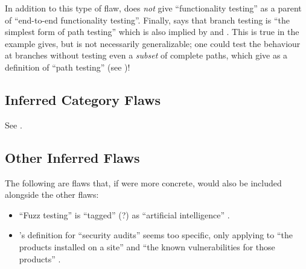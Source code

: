 

In addition to this type of flaw, \citep[Tab.~2]{Gerrard2000a} does
\emph{not} give ``functionality testing'' as a parent of ``end-to-end
functionality testing''. Finally, \citet[p.~119]{Patton2006} says that
branch testing is ``the simplest form of path testing'' which is also
implied by \citet[Fig.~F.1]{IEEE2021c} and
\citet[p.~433]{vanVliet2000}. This is true in the example
\citeauthor{Patton2006} gives, but is not necessarily generalizable; one
could test the behaviour at branches without testing even a \emph{subset}
of complete paths, which \citet[p.~316]{IEEE2017} give as a definition of
``path testing'' (see )!

\subsection{Inferred Category Flaws}
See .



\subsection{Other Inferred Flaws}
The following are flaws that, if were more concrete, would also be
included alongside the other flaws:
\begin{itemize}
    \item ``Fuzz testing'' is ``tagged'' (?) as ``artificial
          intelligence'' \citep[p.~5]{IEEE2022}.
    \item \citeauthor{Gerrard2000b}'s definition for ``security
          audits'' seems too specific, only applying to ``the products
          installed on a site'' and ``the known vulnerabilities for
          those products'' \citeyearpar[p.~28]{Gerrard2000b}.
\end{itemize}
